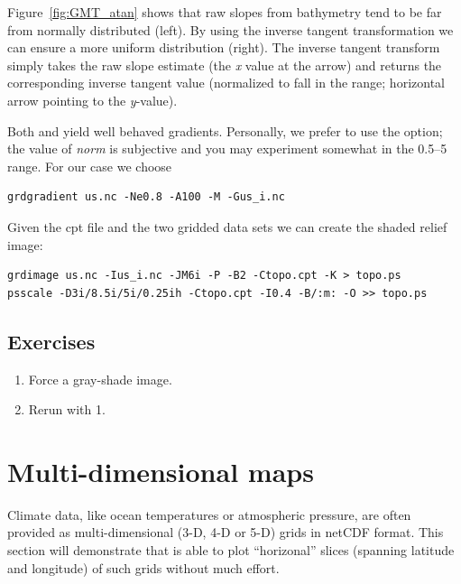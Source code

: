 \documentclass{report}
\begin{document}
Figure~\ref{fig:GMT_atan} shows that raw slopes from bathymetry tend to be
far from normally distributed (left).  By using the inverse tangent
transformation we can ensure a more uniform distribution (right).
The inverse tangent transform simply takes the raw slope estimate
(the {\it x} value at the arrow) and returns the corresponding inverse
tangent value (normalized to fall in the  range; horizontal
arrow pointing to the {\it y}-value).


Both  and  yield well behaved gradients.  Personally,
we prefer to use the  option; the value of
{\it norm} is subjective and you may experiment somewhat in the
0.5--5 range.  For our case we choose

{\small\begin{verbatim}
grdgradient us.nc -Ne0.8 -A100 -M -Gus_i.nc
\end{verbatim}
}

Given the cpt file and the two gridded data sets we can
create the shaded relief image:

{\small\begin{verbatim}
grdimage us.nc -Ius_i.nc -JM6i -P -B2 -Ctopo.cpt -K > topo.ps
psscale -D3i/8.5i/5i/0.25ih -Ctopo.cpt -I0.4 -B/:m: -O >> topo.ps
\end{verbatim}
}

\subsection{Exercises}

\begin{enumerate}

\item Force a gray-shade image.

\item Rerun  with 1.

\end{enumerate}

\section{Multi-dimensional maps}

Climate data, like ocean temperatures or atmospheric pressure, are often provided as
multi-dimensional (3-D, 4-D or 5-D) grids in netCDF format. This section will demonstrate
that \GMT{} is able to plot ``horizonal''
slices (spanning latitude and longitude) of such grids without much effort.
\end{document}
